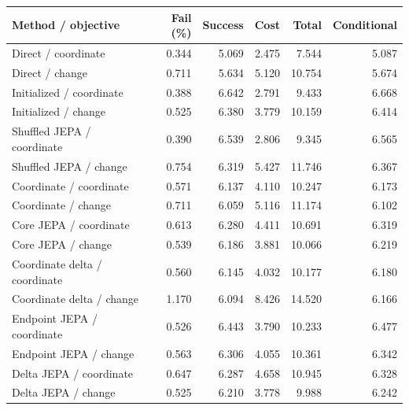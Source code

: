 \begin{tabular}{lrrrrr}\toprule
Method / objective & Fail (\%) & Success & Cost & Total & Conditional\\\midrule
Direct / coordinate & 0.344 & 5.069 & 2.475 & 7.544 & 5.087 \\
Direct / change & 0.711 & 5.634 & 5.120 & 10.754 & 5.674 \\
Initialized / coordinate & 0.388 & 6.642 & 2.791 & 9.433 & 6.668 \\
Initialized / change & 0.525 & 6.380 & 3.779 & 10.159 & 6.414 \\
Shuffled JEPA / coordinate & 0.390 & 6.539 & 2.806 & 9.345 & 6.565 \\
Shuffled JEPA / change & 0.754 & 6.319 & 5.427 & 11.746 & 6.367 \\
Coordinate / coordinate & 0.571 & 6.137 & 4.110 & 10.247 & 6.173 \\
Coordinate / change & 0.711 & 6.059 & 5.116 & 11.174 & 6.102 \\
Core JEPA / coordinate & 0.613 & 6.280 & 4.411 & 10.691 & 6.319 \\
Core JEPA / change & 0.539 & 6.186 & 3.881 & 10.066 & 6.219 \\
Coordinate delta / coordinate & 0.560 & 6.145 & 4.032 & 10.177 & 6.180 \\
Coordinate delta / change & 1.170 & 6.094 & 8.426 & 14.520 & 6.166 \\
Endpoint JEPA / coordinate & 0.526 & 6.443 & 3.790 & 10.233 & 6.477 \\
Endpoint JEPA / change & 0.563 & 6.306 & 4.055 & 10.361 & 6.342 \\
Delta JEPA / coordinate & 0.647 & 6.287 & 4.658 & 10.945 & 6.328 \\
Delta JEPA / change & 0.525 & 6.210 & 3.778 & 9.988 & 6.242 \\
\bottomrule\end{tabular}
